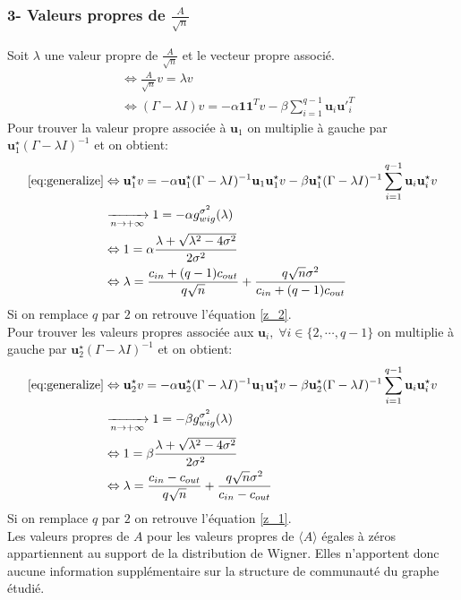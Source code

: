 \subsubsection*{3- Valeurs propres de $\frac{A}{\sqrt{n}}$}
Soit $\lambda$ une valeur propre de $\frac{A}{\sqrt{n}}$ et le vecteur propre associé.
\begin{align}
&\Leftrightarrow \frac{A}{\sqrt{n}}v =\lambda v \nonumber \\
&\Leftrightarrow (\Gamma - \lambda I)v =-\alpha \mathbf{11}^Tv - \beta \sum_{i=1}^{q-1}\mathbf{u}_i\mathbf{u'}_i^T \label{eq:generalize}
\end{align}
Pour trouver la valeur propre associée à $\mathbf{u}_1$ on multiplie à gauche par $\mathbf{u}_1^{\star}(\Gamma -\lambda I)^{-1}$ et on obtient:
\begin{align}
\eqref{eq:generalize} &\Leftrightarrow \mathbf{u}_1^{\star}v =-\alpha \mathbf{u}_1^{\star}(\Gamma -\lambda I)^{-1}\mathbf{u}_1\mathbf{u}_1^{\star}v - \beta \mathbf{u}_1^{\star}(\Gamma -\lambda I)^{-1}\sum_{i=1}^{q-1}\mathbf{u}_i\mathbf{u}_i^{\star}v \nonumber\\
&\xrightarrow[n \to +\infty]{} 1 = -\alpha g_{wig}^{\sigma^2}(\lambda) \nonumber\\
&\Leftrightarrow 1 = \alpha \frac{\lambda + \sqrt{\lambda^2 - 4\sigma^2}}{2\sigma^2} \nonumber\\
&\Leftrightarrow \lambda = \frac{c_{in} + (q-1)c_{out}}{q\sqrt{n}} + \frac{q\sqrt{n}\sigma^2}{c_{in} + (q-1)c_{out}} \label{eq:z_2 generalize}
\end{align}
Si on remplace $q$ par $2$ on retrouve l'équation \eqref{z_2}.\\
Pour trouver les valeurs propres associée aux $\mathbf{u}_i, \; \forall i \in \{2, \cdots, q-1\}$ on multiplie à gauche par $\mathbf{u}_2^{\star}(\Gamma -\lambda I)^{-1}$ et on obtient:
\begin{align}
\eqref{eq:generalize} &\Leftrightarrow \mathbf{u}_2^{\star}v =-\alpha \mathbf{u}_2^{\star}(\Gamma -\lambda I)^{-1}\mathbf{u}_1\mathbf{u}_1^{\star}v - \beta \mathbf{u}_2^{\star}(\Gamma -\lambda I)^{-1}\sum_{i=1}^{q-1}\mathbf{u}_i\mathbf{u}_i^{\star}v \nonumber\\
&\xrightarrow[n \to +\infty]{} 1 = -\beta g_{wig}^{\sigma^2}(\lambda) \nonumber\\
&\Leftrightarrow 1 = \beta \frac{\lambda + \sqrt{\lambda^2 - 4\sigma^2}}{2\sigma^2} \nonumber\\
&\Leftrightarrow \lambda = \frac{c_{in} - c_{out}}{q\sqrt{n}} + \frac{q\sqrt{n}\sigma^2}{c_{in} - c_{out}}\label{eq:z_1 generalize}
\end{align}
Si on remplace $q$ par $2$ on retrouve l'équation \eqref{z_1}.\\
Les valeurs propres de $A$ pour les valeurs propres de $\langle A \rangle$ égales à zéros appartiennent au support de la distribution de Wigner.
Elles n'apportent donc aucune information supplémentaire sur la structure de communauté du graphe étudié.\\   

